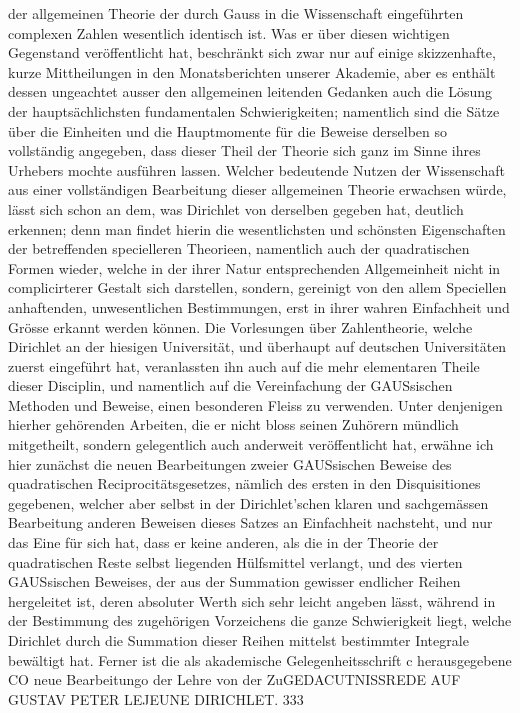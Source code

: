 \documentclass[11pt]{article}
\begin{document}
\noindent der allgemeinen Theorie der durch Gauss in die Wissenschaft eingeführten complexen Zahlen wesentlich identisch ist. Was er über diesen wichtigen Gegenstand veröffentlicht hat, beschränkt sich zwar nur auf einige skizzenhafte, kurze Mittheilungen in den Monatsberichten unserer Akademie, aber es enthält dessen ungeachtet ausser den allgemeinen leitenden Gedanken auch die Lösung der hauptsächlichsten fundamentalen Schwierigkeiten; namentlich sind die Sätze über die Einheiten und die Hauptmomente für die Beweise derselben so vollständig angegeben, dass dieser Theil der Theorie sich ganz im Sinne ihres Urhebers mochte ausführen lassen. Welcher bedeutende Nutzen der Wissenschaft aus einer vollständigen Bearbeitung dieser allgemeinen Theorie erwachsen würde, lässt sich schon an dem, was Dirichlet von derselben gegeben hat, deutlich erkennen; denn man findet hierin die wesentlichsten und schönsten Eigenschaften der betreffenden specielleren Theorieen, namentlich auch der quadratischen Formen wieder, welche in der ihrer Natur entsprechenden Allgemeinheit nicht in complicirterer Gestalt sich darstellen, sondern, gereinigt von den allem Speciellen anhaftenden, unwesentlichen Bestimmungen, erst in ihrer wahren Einfachheit und Grösse erkannt werden können. Die Vorlesungen über Zahlentheorie, welche Dirichlet an der hiesigen Universität, und überhaupt auf deutschen Universitäten zuerst eingeführt hat, veranlassten ihn auch auf die mehr elementaren Theile dieser Disciplin, und namentlich auf die Vereinfachung der GAUSsischen Methoden und Beweise, einen besonderen Fleiss zu verwenden. Unter denjenigen hierher gehörenden Arbeiten, die er nicht bloss seinen Zuhörern mündlich mitgetheilt, sondern gelegentlich auch anderweit veröffentlicht hat, erwähne ich hier zunächst die neuen Bearbeitungen zweier GAUSsischen Beweise des quadratischen Reciprocitätsgesetzes, nämlich des ersten in den Disquisitiones gegebenen, welcher aber selbst in der Dirichlet’schen klaren und sachgemässen Bearbeitung anderen Beweisen dieses Satzes an Einfachheit nachsteht, und nur das Eine für sich hat, dass er keine anderen, als die in der Theorie der quadratischen Reste selbst liegenden Hülfsmittel verlangt, und des vierten GAUSsischen Beweises, der aus der Summation gewisser endlicher Reihen hergeleitet ist, deren absoluter Werth sich sehr leicht angeben lässt, während in der Bestimmung des zugehörigen Vorzeichens die ganze Schwierigkeit liegt, welche Dirichlet durch die Summation dieser Reihen mittelst bestimmter Integrale bewältigt hat. Ferner ist die als akademische Gelegenheitsschrift c herausgegebene CO neue Bearbeitungo der Lehre von der ZuGEDACUTNISSREDE AUF GUSTAV PETER LEJEUNE DIRICHLET. 333
\par
\end{document}
